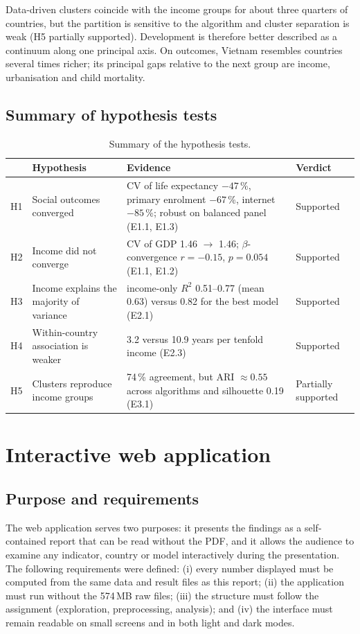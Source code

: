 \documentclass[11pt,a4paper]{article}
\begin{document}
\begin{summary}[Answer to RQ3]
Data-driven clusters coincide with the income groups for about three quarters of countries, but the partition is sensitive to the algorithm and cluster separation is weak (H5 partially supported). Development is therefore better described as a continuum along one principal axis. On outcomes, Vietnam resembles countries several times richer; its principal gaps relative to the next group are income, urbanisation and child mortality.
\end{summary}

\subsection{Summary of hypothesis tests}
\begin{table}[htbp]\centering\small
\caption{Summary of the hypothesis tests.}\label{tab:hyp}
\begin{tabular}{p{0.6cm}p{5.4cm}p{6.2cm}p{2.2cm}}
\toprule
& Hypothesis & Evidence & Verdict \\
\midrule
H1 & Social outcomes converged & CV of life expectancy $-47$\,\%, primary enrolment $-67$\,\%, internet $-85$\,\%; robust on balanced panel (E1.1, E1.3) & Supported \\
H2 & Income did not converge & CV of GDP 1.46 $\to$ 1.46; $\beta$-convergence $r=-0.15$, $p=0.054$ (E1.1, E1.2) & Supported \\
H3 & Income explains the majority of variance & income-only $R^2$ 0.51--0.77 (mean 0.63) versus 0.82 for the best model (E2.1) & Supported \\
H4 & Within-country association is weaker & 3.2 versus 10.9 years per tenfold income (E2.3) & Supported \\
H5 & Clusters reproduce income groups & 74\,\% agreement, but ARI $\approx 0.55$ across algorithms and silhouette 0.19 (E3.1) & Partially supported \\
\bottomrule
\end{tabular}
\end{table}

\section{Interactive web application}\label{sec:app}

\subsection{Purpose and requirements}
The web application serves two purposes: it presents the findings as a self-contained report that can be read without the PDF, and it allows the audience to examine any indicator, country or model interactively during the presentation. The following requirements were defined: (i) every number displayed must be computed from the same data and result files as this report; (ii) the application must run without the 574\,MB raw files; (iii) the structure must follow the assignment (exploration, preprocessing, analysis); and (iv) the interface must remain readable on small screens and in both light and dark modes.
\end{document}
